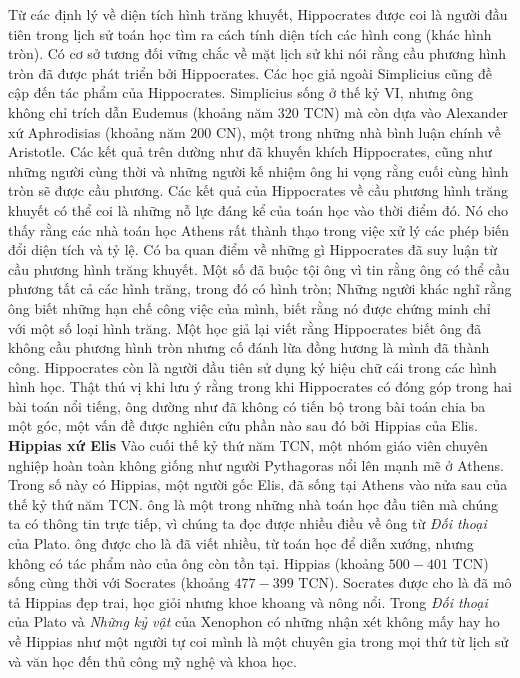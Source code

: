 \begin{multicols}{2}
	\vskip 0.05cm
	Từ các định lý về diện tích hình trăng khuyết, Hippocrates được coi là người đầu tiên trong lịch sử toán học tìm ra cách tính diện tích các hình cong (khác hình tròn). 
	\vskip 0.05cm
	Có cơ sở tương đối vững chắc về mặt lịch sử  khi nói rằng cầu phương hình tròn đã được phát triển bởi Hippocrates. Các học giả ngoài Simplicius cũng đề cập đến tác phẩm của Hippocrates. Simplicius sống ở thế kỷ VI, nhưng ông không chỉ trích dẫn Eudemus (khoảng năm $320$ TCN) mà còn dựa vào Alexander xứ Aphrodisias (khoảng năm $200$ CN), một trong những nhà bình luận chính về Aristotle. 
	Các kết quả trên dường như đã khuyến khích Hippocrates, cũng như những người cùng thời và những người kế nhiệm ông hi vọng rằng cuối cùng hình tròn sẽ được cầu phương.
	\vskip 0.05cm
	Các kết quả của Hippocrates về cầu phương hình trăng khuyết có thể coi là những nỗ lực đáng kể của toán học vào thời điểm đó. Nó cho thấy rằng các nhà toán học Athens rất thành thạo trong việc xử lý các phép biến đổi diện tích và tỷ lệ.
	\vskip 0.05cm 
	Có ba quan điểm về những gì Hippocrates đã suy luận từ cầu phương hình trăng khuyết. Một số đã buộc tội ông vì tin rằng ông có thể cầu phương tất cả các hình trăng, trong đó có hình tròn; Những người khác nghĩ rằng ông biết những hạn chế công việc của mình, biết rằng nó được chứng minh chỉ với một số loại hình trăng. Một học giả lại viết rằng Hippocrates biết ông đã không cầu phương hình tròn nhưng cố đánh lừa đồng hương là mình đã thành công. 
	\vskip 0.05cm
	Hippocrates còn là người đầu tiên sử dụng ký hiệu chữ cái trong các hình hình học. Thật thú vị khi lưu ý rằng trong khi Hippocrates có đóng góp trong hai bài toán nổi tiếng, ông dường như đã không có tiến bộ trong bài toán chia ba một góc, một vấn đề được nghiên cứu phần nào sau đó bởi Hippias của Elis.
	\vskip 0.05cm
	\textbf{\color{lichsutoanhoc}Hippias xứ Elis}
	\vskip 0.05cm
	Vào cuối thế kỷ thứ năm TCN, một nhóm giáo viên chuyên nghiệp hoàn toàn không giống như người Pythagoras nổi lên mạnh mẽ ở Athens. Trong số này có Hippias, một người gốc Elis, đã sống tại Athens vào nửa sau của thế kỷ thứ năm TCN.  ông là một trong những nhà toán học đầu tiên mà chúng ta có thông tin trực tiếp, vì chúng ta đọc được nhiều điều về ông từ \textit{Đối thoại} của Plato. ông được cho là đã viết nhiều, từ toán học để diễn xướng, nhưng không có tác phẩm nào của ông còn tồn tại.  
	\vskip 0.05cm
	Hippias (khoảng $500-401$ TCN)  sống cùng thời với Socrates (khoảng $477-399$ TCN). Socrates được cho là đã mô tả Hippias đẹp trai, học giỏi nhưng khoe khoang và nông nổi. Trong \textit{Đối thoại} của Plato và \textit{Những kỷ vật} của Xenophon có những nhận xét không mấy hay ho về Hippias như một người tự coi mình là một chuyên gia trong mọi thứ từ lịch sử và văn học đến thủ công mỹ nghệ và khoa học. 

\end{multicols}
